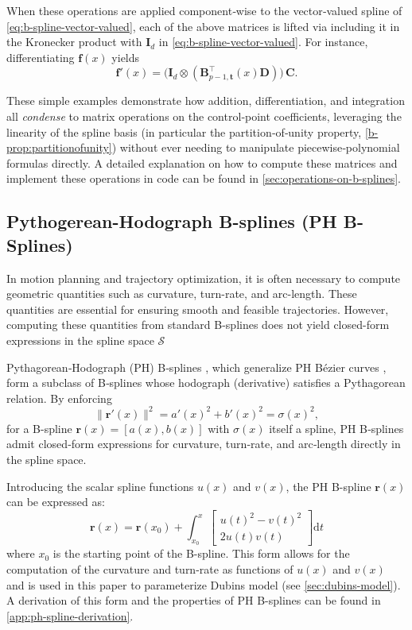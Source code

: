 When these operations are applied component‐wise to the vector‐valued spline of \cref{eq:b-spline-vector-valued}, each of the above matrices is lifted via including it in the Kronecker product with $\mathbf{I}_d$ in \cref{eq:b-spline-vector-valued}.  For instance, differentiating $\mathbf f(x)$ yields
\begin{equation}
  \mathbf f'(x)
  = \bigl(\mathbf{I}_d \otimes (\mathbf{B}_{p-1,\mathbf{t}}^\top(x) \mathbf{D})\bigr)
  \,\mathbf{C}.
\end{equation}

These simple examples demonstrate how addition, differentiation, and integration all \emph{condense} to matrix operations on the control‐point coefficients, leveraging the linearity of the spline basis (in particular the partition‐of‐unity property, \cref{b-prop:partitionofunity}) without ever needing to manipulate piecewise‐polynomial formulas directly. A detailed explanation on how to compute these matrices and implement these operations in code can be found in \cref{sec:operations-on-b-splines}.



\subsection{Pythogerean-Hodograph B-splines (PH B-Splines)}\label{sec:pythogerean-hodograph}
In motion planning and trajectory optimization, it is often necessary to compute geometric quantities such as curvature, turn-rate, and arc-length. These quantities are essential for ensuring smooth and feasible trajectories. However, computing these quantities from standard B-splines does not yield closed-form expressions in the spline space $\mathcal S$ 

Pythagorean‐Hodograph (PH) B‐splines \citep{Albrecht2016}, which generalize PH Bézier curves \citep{Farouki1990}, form a subclass of B‐splines whose hodograph (derivative) satisfies a Pythagorean relation.  By enforcing 
\[
  \|\mathbf r'(x)\|^2 = a'(x)^2 + b'(x)^2 = \sigma(x)^2,
\]
for a B-spline $\mathbf r(x) = [a(x), b(x)]$ with \(\sigma(x)\) itself a spline, PH B‐splines admit closed‐form expressions for curvature, turn‐rate, and arc‐length directly in the spline space.  

Introducing the scalar spline functions $u(x)$ and $v(x)$, the PH B-spline $\mathbf r(x)$ can be expressed as:
\begin{equation}\label{eq:ph-b-spline}
    \mathbf r(x) = \mathbf r(x_0) + \int_{x_0}^x 
    \begin{bmatrix}
        u(t)^2 - v(t)^2 \\
        2u(t)v(t)
    \end{bmatrix} \mathrm{d}t
\end{equation}
where $x_0$ is the starting point of the B-spline. This form allows for the computation of the curvature and turn-rate as functions of $u(x)$ and $v(x)$ and is used in this paper to parameterize Dubins model (see \cref{sec:dubins-model}). A derivation of this form and the properties of PH B-splines can be found in \cref{app:ph-spline-derivation}.

